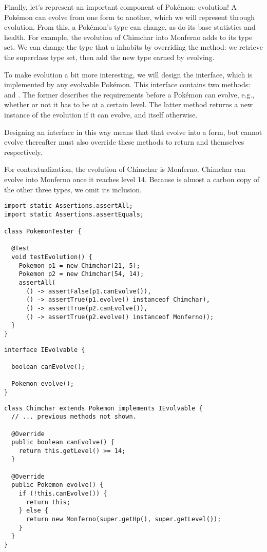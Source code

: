 Finally, let's represent an important component of Pok\'emon: evolution! A Pok\'emon can evolve from one form to another, which we will represent through evolution. From this, a Pok\'emon's type can change, as do its base statistics and health. For example, the evolution of Chimchar into Monferno adds  to its type set. We can change the type that a  inhabits by overriding the  method: we retrieve the superclass type set, then add the new type earned by evolving.

To make evolution a bit more interesting, we will design the  interface, which is implemented by any evolvable Pok\'emon. This interface contains two methods:  and . The former describes the requirements before a Pok\'emon can evolve, e.g., whether or not it has to be at a certain level. The latter  method returns a new instance of the evolution if it can evolve, and itself otherwise. 

Designing an interface in this way means that  that evolve into a form, but cannot evolve thereafter must also override these methods to return  and themselves respectively.

For contextualization, the evolution of Chimchar is Monferno. Chimchar can evolve into Monferno once it reaches level 14. Because  is almost a carbon copy of the other three types, we omit its inclusion.

\begin{lstlisting}[language=MyJava]
import static Assertions.assertAll;
import static Assertions.assertEquals;

class PokemonTester {

  @Test 
  void testEvolution() {
    Pokemon p1 = new Chimchar(21, 5);
    Pokemon p2 = new Chimchar(54, 14);
    assertAll(
      () -> assertFalse(p1.canEvolve()),
      () -> assertTrue(p1.evolve() instanceof Chimchar),
      () -> assertTrue(p2.canEvolve()),
      () -> assertTrue(p2.evolve() instanceof Monferno));
  }
}
\end{lstlisting}

\begin{lstlisting}[language=MyJava]
interface IEvolvable {

  boolean canEvolve();

  Pokemon evolve();
}
\end{lstlisting}

\begin{lstlisting}[language=MyJava]
class Chimchar extends Pokemon implements IEvolvable {
  // ... previous methods not shown.

  @Override
  public boolean canEvolve() {
    return this.getLevel() >= 14;
  }

  @Override
  public Pokemon evolve() {
    if (!this.canEvolve()) {
      return this;
    } else {
      return new Monferno(super.getHp(), super.getLevel());
    }
  }
}
\end{lstlisting}


